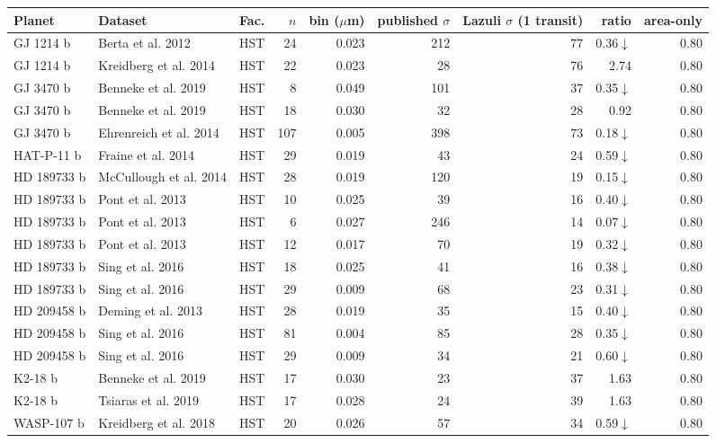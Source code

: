 \begin{table}[H]
\centering\scriptsize
\begin{tabular}{@{}lllrrrrrr@{}}
\toprule
\textbf{Planet} & \textbf{Dataset} & \textbf{Fac.} & \textbf{$n$} & \textbf{bin ($\mu$m)} & \textbf{published $\sigma$} & \textbf{Lazuli $\sigma$ (1 transit)} & \textbf{ratio} & \textbf{area-only} \\
\midrule
GJ 1214 b & Berta et al. 2012 & HST & 24 & 0.023 & 212 & 77 & 0.36$\downarrow$ & 0.80 \\
GJ 1214 b & Kreidberg et al. 2014 & HST & 22 & 0.023 & 28 & 76 & 2.74 & 0.80 \\
GJ 3470 b & Benneke et al. 2019 & HST & 8 & 0.049 & 101 & 37 & 0.35$\downarrow$ & 0.80 \\
GJ 3470 b & Benneke et al. 2019 & HST & 18 & 0.030 & 32 & 28 & 0.92 & 0.80 \\
GJ 3470 b & Ehrenreich et al. 2014 & HST & 107 & 0.005 & 398 & 73 & 0.18$\downarrow$ & 0.80 \\
HAT-P-11 b & Fraine et al. 2014 & HST & 29 & 0.019 & 43 & 24 & 0.59$\downarrow$ & 0.80 \\
HD 189733 b & McCullough et al. 2014 & HST & 28 & 0.019 & 120 & 19 & 0.15$\downarrow$ & 0.80 \\
HD 189733 b & Pont et al. 2013 & HST & 10 & 0.025 & 39 & 16 & 0.40$\downarrow$ & 0.80 \\
HD 189733 b & Pont et al. 2013 & HST & 6 & 0.027 & 246 & 14 & 0.07$\downarrow$ & 0.80 \\
HD 189733 b & Pont et al. 2013 & HST & 12 & 0.017 & 70 & 19 & 0.32$\downarrow$ & 0.80 \\
HD 189733 b & Sing et al. 2016 & HST & 18 & 0.025 & 41 & 16 & 0.38$\downarrow$ & 0.80 \\
HD 189733 b & Sing et al. 2016 & HST & 29 & 0.009 & 68 & 23 & 0.31$\downarrow$ & 0.80 \\
HD 209458 b & Deming et al. 2013 & HST & 28 & 0.019 & 35 & 15 & 0.40$\downarrow$ & 0.80 \\
HD 209458 b & Sing et al. 2016 & HST & 81 & 0.004 & 85 & 28 & 0.35$\downarrow$ & 0.80 \\
HD 209458 b & Sing et al. 2016 & HST & 29 & 0.009 & 34 & 21 & 0.60$\downarrow$ & 0.80 \\
K2-18 b & Benneke et al. 2019 & HST & 17 & 0.030 & 23 & 37 & 1.63 & 0.80 \\
K2-18 b & Tsiaras et al. 2019 & HST & 17 & 0.028 & 24 & 39 & 1.63 & 0.80 \\
WASP-107 b & Kreidberg et al. 2018 & HST & 20 & 0.026 & 57 & 34 & 0.59$\downarrow$ & 0.80 \\

\end{tabular}
\end{table}

